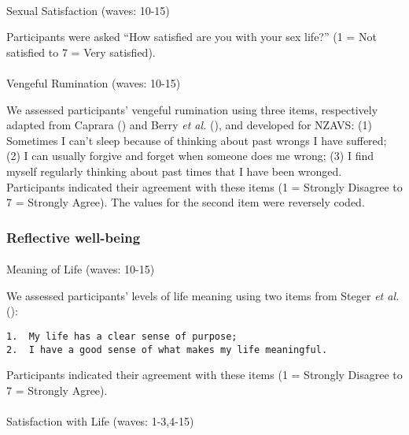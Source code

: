 \documentclass[
  singlecolumn,
  9pt]{article}
\makeatletter
\let\oldparagraph\paragraph
\renewcommand{\paragraph}{
    \@ifstar
      \xxxParagraphStar
      \xxxParagraphNoStar
  }
\newcommand{\xxxParagraphStar}[1]{\oldparagraph*{#1}\mbox{}}
\newcommand{\xxxParagraphNoStar}[1]{\oldparagraph{#1}\mbox{}}
\makeatother
\begin{document}
\paragraph{Sexual Satisfaction (waves:
10-15)}\label{sexual-satisfaction-waves-10-15}

Participants were asked ``How satisfied are you with your sex life?'' (1
= Not satisfied to 7 = Very satisfied).

\paragraph{Vengeful Rumination (waves:
10-15)}\label{vengeful-rumination-waves-10-15}

We assessed participants' vengeful rumination using three items,
respectively adapted from Caprara
() and Berry \emph{et al.}
(), and developed for
NZAVS: (1) Sometimes I can't sleep because of thinking about past wrongs
I have suffered; (2) I can usually forgive and forget when someone does
me wrong; (3) I find myself regularly thinking about past times that I
have been wronged. Participants indicated their agreement with these
items (1 = Strongly Disagree to 7 = Strongly Agree). The values for the
second item were reversely coded.

\subsubsection{Reflective well-being}\label{reflective-well-being}

\paragraph{Meaning of Life (waves:
10-15)}\label{meaning-of-life-waves-10-15}

We assessed participants' levels of life meaning using two items from
Steger \emph{et al.} ():

\begin{verbatim}
1.  My life has a clear sense of purpose;
2.  I have a good sense of what makes my life meaningful.
\end{verbatim}

Participants indicated their agreement with these items (1 = Strongly
Disagree to 7 = Strongly Agree).

\paragraph{Satisfaction with Life (waves:
1-3,4-15)}\label{satisfaction-with-life-waves-1-34-15}
\end{document}
